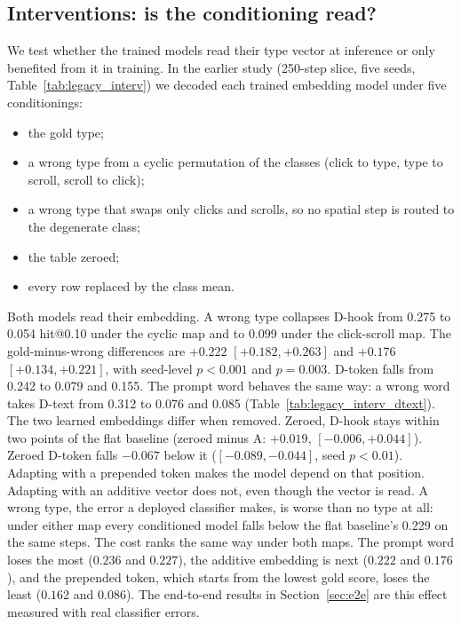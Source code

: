 \documentclass[letterpaper]{article} %
\makeatletter
\newcommand{\hitat}[1]{hit@#1}
\makeatother
\begin{document}
\subsection{Interventions: is the conditioning read?}
\label{sec:interventions}
We test whether the trained models read their type vector at inference or only benefited from it in training. In the earlier study (250-step slice, five seeds, Table~\ref{tab:legacy_interv}) we decoded each trained embedding model under five conditionings:
\begin{itemize}
\item the gold type;
\item a wrong type from a cyclic permutation of the classes (click to type, type to scroll, scroll to click);
\item a wrong type that swaps only clicks and scrolls, so no spatial step is routed to the degenerate class;
\item the table zeroed;
\item every row replaced by the class mean.
\end{itemize}
Both models read their embedding. A wrong type collapses D-hook from 0.275 to 0.054 \hitat{0.10} under the cyclic map and to 0.099 under the click-scroll map. The gold-minus-wrong differences are $+0.222$ $[+0.182, +0.263]$ and $+0.176$ $[+0.134, +0.221]$, with seed-level $p < 0.001$ and $p = 0.003$. D-token falls from 0.242 to 0.079 and 0.155. The prompt word behaves the same way: a wrong word takes D-text from 0.312 to 0.076 and 0.085 (Table~\ref{tab:legacy_interv_dtext}). The two learned embeddings differ when removed. Zeroed, D-hook stays within two points of the flat baseline (zeroed minus A: $+0.019$, $[-0.006, +0.044]$). Zeroed D-token falls $-0.067$ below it ($[-0.089, -0.044]$, seed $p < 0.01$). Adapting with a prepended token makes the model depend on that position. Adapting with an additive vector does not, even though the vector is read. A wrong type, the error a deployed classifier makes, is worse than no type at all: under either map every conditioned model falls below the flat baseline's 0.229 on the same steps. The cost ranks the same way under both maps. The prompt word loses the most ($0.236$ and $0.227$), the additive embedding is next ($0.222$ and $0.176$), and the prepended token, which starts from the lowest gold score, loses the least ($0.162$ and $0.086$). The end-to-end results in Section~\ref{sec:e2e} are this effect measured with real classifier errors.
\end{document}
